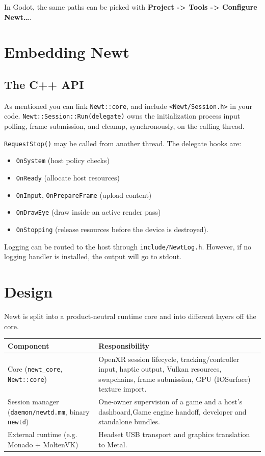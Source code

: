 \documentclass[11pt]{article}
\begin{document}
In Godot, the same paths can be picked with \textbf{Project -> Tools ->  Configure Newt…}.
\section{Embedding Newt}
\label{sec:org2dc1f56}
\subsection{The C++ API}
\label{sec:org9beed48}
As mentioned you can link \texttt{Newt::core}, and include \texttt{<Newt/Session.h>} in your code. \texttt{Newt::Session::Run(delegate)} owns the initialization process input polling, frame submission, and cleanup, synchronously, on the calling thread.

\texttt{RequestStop()} may be called from another thread. The delegate hooks are:
\begin{itemize}
\item \texttt{OnSystem} (host policy checks)
\item \texttt{OnReady} (allocate host resources)
\item \texttt{OnInput}, \texttt{OnPrepareFrame} (upload content)
\item \texttt{OnDrawEye} (draw inside an active render pass)
\item \texttt{OnStopping} (release resources before the device is destroyed).
\end{itemize}

Logging can be routed to the host through \texttt{include/NewtLog.h}. However, if no logging handler is installed, the output will go to stdout.
\section{Design}
\label{sec:orgfa898cb}
Newt is split into a product-neutral runtime core and into different layers off the core.

\begin{center}
\begin{tabular}{ll}
Component & Responsibility\\
\hline
Core (\texttt{newt\_core}, \texttt{Newt::core}) & OpenXR session lifecycle, tracking/controller input, haptic output, Vulkan resources, swapchains, frame submission, GPU (IOSurface) texture import.\\
Session manager (\texttt{daemon/newtd.mm}, binary \texttt{newtd}) & One-owner supervision of a game and a host's dashboard,Game engine handoff, developer and standalone bundles.\\
External runtime (e.g. Monado + MoltenVK) & Headset USB transport and graphics translation to Metal.\\
\end{tabular}
\end{center}
\end{document}

